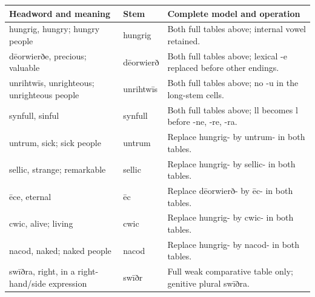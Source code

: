 \par\begingroup
\fontsize{10.5}{13.2}\selectfont
\setlength{\LTleft}{0pt}\setlength{\LTright}{\fill}
\noindent
\begin{tabular}{@{}>{\raggedright\arraybackslash}p{46.15mm}>{\raggedright\arraybackslash}p{19mm}>{\raggedright\arraybackslash}p{53.22mm}@{}}
\toprule
\textbf{Headword and meaning} & \textbf{Stem} & \textbf{Complete model and operation} \\
\midrule
hungrig, hungry; hungry people & hungrig & Both full tables above; internal vowel retained. \\
dēorwierðe, precious; valuable & dēorwierð & Both full tables above; lexical -e replaced before other endings. \\
unrihtwīs, unrighteous; unrighteous people & unrihtwīs & Both full tables above; no -u in the long-stem cells. \\
synfull, sinful & synfull & Both full tables above; ll becomes l before -ne, -re, -ra. \\
untrum, sick; sick people & untrum & Replace hungrig- by untrum- in both tables. \\
sellic, strange; remarkable & sellic & Replace hungrig- by sellic- in both tables. \\
ēce, eternal & ēc & Replace dēorwierð- by ēc- in both tables. \\
cwic, alive; living & cwic & Replace hungrig- by cwic- in both tables. \\
nacod, naked; naked people & nacod & Replace hungrig- by nacod- in both tables. \\
swīðra, right, in a right-hand/\allowbreak{}side expression & swīðr & Full weak comparative table only; genitive plural swīðra. \\
\bottomrule
\end{tabular}
\par\endgroup


